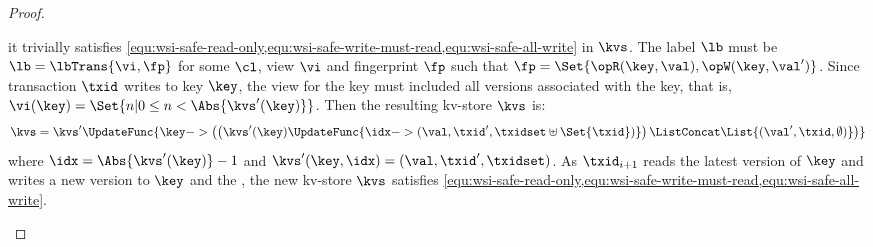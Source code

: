\begin{proof}
\begin{enumerate}
\begin{enumerate}
        it trivially satisfies \cref{equ:wsi-safe-read-only,equ:wsi-safe-write-must-read,equ:wsi-safe-all-write} in \( \kvs \).
        The label \( \lb \) must be \( \lb = \lbTrans{\vi,\fp} \)
        for some \( \cl \), view \( \vi \) and fingerprint \( \fp \)  such that
        \(\fp = \Set{\opR(\key,\val), \opW(\key,\val') } \).
        Since transaction \( \txid \) writes to key \( \key \),
        the view for the key must included all versions associated with the key,
        that is, \( \vi(\key) = \Set{n | 0 \leq n < \Abs{\kvs'(\key)} } \).
        Then the resulting kv-store \( \kvs\) is: 
        \[
            \kvs = \kvs'\UpdateFunc{\key -> \left( \left( \kvs'(\key)\UpdateFunc{ 
                    \idx -> (\val, \txid', \txidset \uplus \Set{\txid})}  \right)
                            \ListConcat \List{(\val', \txid, \emptyset)} \right) } 
        \]
        where \( \idx = \Abs{\kvs'(\key)} - 1\) and \( \kvs'(\key,\idx) = (\val,\txid',\txidset)\).
        As \( \txid_{i+1} \) reads the latest version of \( \key \) and writes a new version to \( \key \) and the \ih,
        the new kv-store \( \kvs \) satisfies 
        \cref{equ:wsi-safe-read-only,equ:wsi-safe-write-must-read,equ:wsi-safe-all-write}. \qedhere
    \end{enumerate}
\end{enumerate}
\end{proof}
